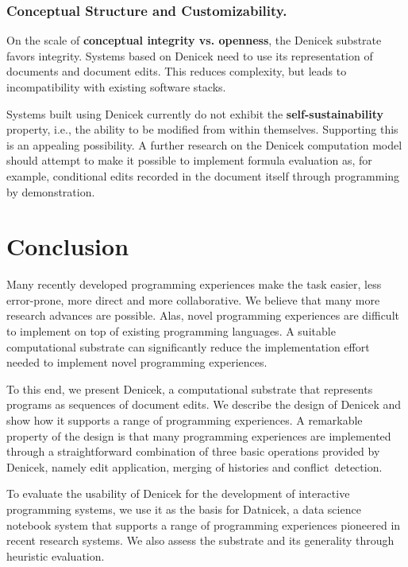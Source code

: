 \documentclass[sigconf]{acmart}
\begin{document}
\subsubsection*{Conceptual Structure and Customizability.}
On the scale of \textbf{conceptual integrity vs. openness}, the Denicek substrate favors integrity.
Systems based on Denicek need to use its representation of documents and document edits. This reduces
complexity, but leads to incompatibility with existing software stacks.

Systems built using Denicek currently do not exhibit the \textbf{self-sustainability} property,
i.e., the ability to be modified from within themselves. Supporting this is an appealing
possibility. A further research on the Denicek computation model should attempt to make it possible
to implement formula evaluation as, for example, conditional edits recorded in the document itself
through programming by demonstration.


\section{Conclusion}
Many recently developed programming experiences make the task easier, less error-prone,
more direct and more collaborative. We believe that many more research advances are possible.
Alas, novel programming experiences are difficult to implement on top of
existing programming languages. A suitable computational substrate can
significantly reduce the implementation effort needed to implement novel programming experiences.

To this end, we present Denicek, a computational substrate that represents programs as sequences
of document edits. We describe the design of Denicek and show how it supports a range of
programming experiences. A remarkable property of the design is that many programming experiences are
implemented through a straightforward combination of three basic operations provided by Denicek, namely edit
application, merging of histories and conflict~detection.

To evaluate the usability of Denicek for the development of interactive programming systems,
we use it as the basis for Datnicek, a data science notebook system that supports a range of
programming experiences pioneered in recent research systems. We also assess the substrate and
its generality through heuristic evaluation.
\end{document}

